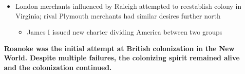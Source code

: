 \documentclass[a4paper]{article}
\begin{document}
{\begin{itemize}
                \begin{itemize}
                    \item James I succeeded as monarch, having Raleigh imprisoned for more than a decade for plotting against the king, finally executing him
                    \item Colonizing impulse remained powerful
                \end{itemize}
                \item London merchants influenced by Raleigh attempted to reestablish colony in Virginia; rival Plymouth merchants had similar desires further north
                \begin{itemize}
                    \item James I issued new charter dividing America between two groups
                \end{itemize}
            \end{itemize}
            \textbf{Roanoke was the initial attempt at British colonization in the New World. Despite multiple failures, the colonizing spirit remained alive and the colonization continued.}
        }
    
\end{document}
